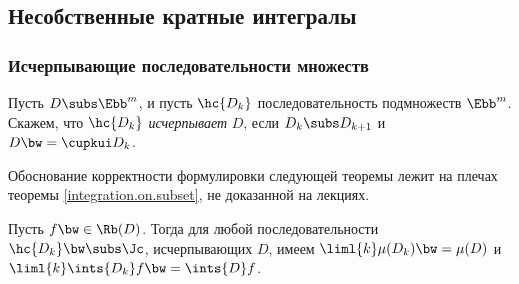 \documentclass[a4paper]{article}
\begin{document}
\subsection{Несобственные кратные интегралы}

\subsubsection{Исчерпывающие последовательности множеств}

\begin{df}
Пусть $D \subs \Ebb^m$, и пусть $\hc{D_k}$ последовательность подмножеств $\Ebb^m$. Скажем, что $\hc{D_k}$
\emph{исчерпывает} $D$, если $D_k \subs D_{k+1}$ и $D \bw= \cupkui D_k$.
\end{df}

Обоснование корректности формулировки следующей теоремы лежит на плечах теоремы \ref{integration.on.subset},
не доказанной на лекциях.
\begin{theorem}
Пусть $f \bw\in \Rb(D)$. Тогда для любой последовательности $\hc{D_k} \bw\subs \Jc$, исчерпывающих $D$, имеем
$\liml{k} \mu(D_k) \bw= \mu(D)$ и $\liml{k} \ints{D_k} f \bw= \ints{D} f$.
\end{theorem}
\end{document}
